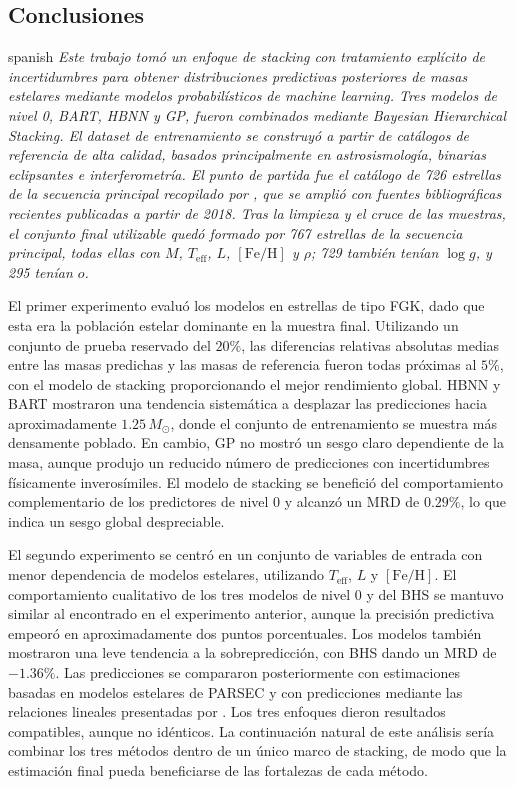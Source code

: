 \subsection*{Conclusiones}
\medskip
\begin{otherlanguage*}{spanish}
\itshape
\noindent Este trabajo tom\'o un enfoque de stacking con tratamiento expl\'icito de incertidumbres para obtener distribuciones predictivas posteriores de masas estelares mediante modelos probabil\'isticos de machine learning. Tres modelos de nivel 0, BART, HBNN y GP, fueron combinados mediante Bayesian Hierarchical Stacking. El dataset de entrenamiento se construy\'o a partir de cat\'alogos de referencia de alta calidad, basados principalmente en astrosismolog\'ia, binarias eclipsantes e interferometr\'ia. El punto de partida fue el cat\'alogo de 726 estrellas de la secuencia principal recopilado por \citet{moya2018}, que se ampli\'o con fuentes bibliogr\'aficas recientes publicadas a partir de 2018. Tras la limpieza y el cruce de las muestras, el conjunto final utilizable qued\'o formado por 767 estrellas de la secuencia principal, todas ellas con $M$, $T_{\mathrm{eff}}$, $L$, $[\mathrm{Fe}/\mathrm{H}]$ y $\rho$; 729 tambi\'en ten\'ian $\log g$, y 295 ten\'ian $o$.

El primer experimento evalu\'o los modelos en estrellas de tipo FGK, dado que esta era la poblaci\'on estelar dominante en la muestra final. Utilizando un conjunto de prueba reservado del $20\%$, las diferencias relativas absolutas medias entre las masas predichas y las masas de referencia fueron todas pr\'oximas al $5\%$, con el modelo de stacking proporcionando el mejor rendimiento global. HBNN y BART mostraron una tendencia sistem\'atica a desplazar las predicciones hacia aproximadamente $1.25\,M_\odot$, donde el conjunto de entrenamiento se muestra m\'as densamente poblado. En cambio, GP no mostr\'o un sesgo claro dependiente de la masa, aunque produjo un reducido n\'umero de predicciones con incertidumbres f\'isicamente inveros\'imiles. El modelo de stacking se benefici\'o del comportamiento complementario de los predictores de nivel 0 y alcanz\'o un MRD de $0.29\%$, lo que indica un sesgo global despreciable.

El segundo experimento se centr\'o en un conjunto de variables de entrada con menor dependencia de modelos estelares, utilizando $T_{\mathrm{eff}}$, $L$ y $[\mathrm{Fe}/\mathrm{H}]$. El comportamiento cualitativo de los tres modelos de nivel 0 y del BHS se mantuvo similar al encontrado en el experimento anterior, aunque la precisi\'on predictiva empeor\'o en aproximadamente dos puntos porcentuales. Los modelos tambi\'en mostraron una leve tendencia a la sobrepredicci\'on, con BHS dando un MRD de $-1.36\%$. Las predicciones se compararon posteriormente con estimaciones basadas en modelos estelares de PARSEC \citep{bressan2012} y con predicciones mediante las relaciones lineales presentadas por \citet{moya2018}. Los tres enfoques dieron resultados compatibles, aunque no id\'enticos. La continuaci\'on natural de este an\'alisis ser\'ia combinar los tres m\'etodos dentro de un \'unico marco de stacking, de modo que la estimaci\'on final pueda beneficiarse de las fortalezas de cada m\'etodo.


\end{otherlanguage*}
